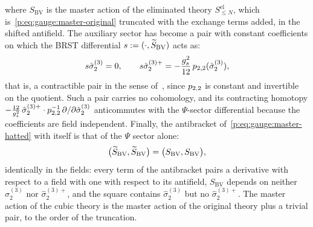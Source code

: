where $S_{\mathrm{BV}}$ is the master action of the eliminated theory $S^{\mathrm{el}}_{\le N}$, which is~\eqref{p:eq:gauge:master-original} truncated with the exchange terms added, in the shifted antifield.
The auxiliary sector has become a pair with constant coefficients on which the BRST differential $s := (\cdot, \caction[\mathrm{BV}])$ acts as:
\begin{equation}
  \label{p:eq:gauge:contractible-pair}
  s \hat\sigma_2^{(3)}
    = 0,
  \qquad
  s \hat\sigma_2^{(3)+}
    = - \frac{\gs^2}{12} \, \sprod{2}{2}(\hat\sigma_2^{(3)}),
\end{equation}
that is, a contractible pair in the sense of~\cite[sec.~17.3.5]{Henneaux:1994:QuantizationGaugeSystems}, since $\sprod{2}{2}$ is constant and invertible on the quotient.
Such a pair carries no cohomology, and its contracting homotopy $- \tfrac{12}{\gs^2} \, \hat\sigma_2^{(3)+} \cdot \sprod{2}{2}^{-1} \, \partial / \partial \hat\sigma_2^{(3)}$ anticommutes with the $\Psi$-sector differential because the coefficients are field independent.
Finally, the antibracket of~\eqref{p:eq:gauge:master-hatted} with itself is that of the $\Psi$ sector alone:
\begin{equation}
  \label{p:eq:gauge:master-equation-reduced}
  \big( \caction[\mathrm{BV}], \caction[\mathrm{BV}] \big)
    = \big( S_{\mathrm{BV}}, S_{\mathrm{BV}} \big),
\end{equation}
identically in the fields: every term of the antibracket pairs a derivative with respect to a field with one with respect to its antifield, $S_{\mathrm{BV}}$ depends on neither $\hat\sigma_2^{(3)}$ nor $\hat\sigma_2^{(3)+}$, and the square contains $\hat\sigma_2^{(3)}$ but no $\hat\sigma_2^{(3)+}$.
The master action of the cubic theory is the master action of the original theory plus a trivial pair, to the order of the truncation.


